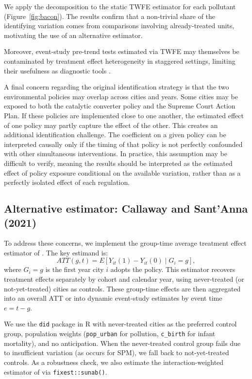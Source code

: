 \documentclass[10pt]{article}
\begin{document}
We apply the \citet{goodman2021} decomposition to the static TWFE estimator for each pollutant (Figure~\ref{fig:bacon}). The results confirm that a non-trivial share of the identifying variation comes from comparisons involving already-treated units, motivating the use of an alternative estimator.

Moreover, event-study pre-trend tests estimated via TWFE may themselves be contaminated by treatment effect heterogeneity in staggered settings, limiting their usefulness as diagnostic tools \citep{sunab2021}.

A final concern regarding the original identification strategy is that the two environmental policies may overlap across cities and years. Some cities may be exposed to both the catalytic converter policy and the Supreme Court Action Plan. If these policies are implemented close to one another, the estimated effect of one policy may partly capture the effect of the other. This creates an additional identification challenge. The coefficient on a given policy can be interpreted causally only if the timing of that policy is not perfectly confounded with other simultaneous interventions. In practice, this assumption may be difficult to verify, meaning the results should be interpreted as the estimated effect of policy exposure conditional on the available variation, rather than as a perfectly isolated effect of each regulation.

\subsection{Alternative estimator: Callaway and Sant'Anna (2021)}

To address these concerns, we implement the group-time average treatment effect estimator of \citet{callaway2021}. The key estimand is:
\begin{equation}\label{eq:att}
ATT(g,t) = E\left[Y_{it}(1) - Y_{it}(0) \mid G_i = g\right],
\end{equation}
where $G_i = g$ is the first year city $i$ adopts the policy. This estimator recovers treatment effects separately by cohort and calendar year, using never-treated (or not-yet-treated) cities as controls. These group-time effects are then aggregated into an overall ATT or into dynamic event-study estimates by event time $e = t - g$.

We use the \texttt{did} package in R with never-treated cities as the preferred control group, population weights (\texttt{pop\_urban} for pollution, \texttt{c\_birth} for infant mortality), and no anticipation. When the never-treated control group fails due to insufficient variation (as occurs for SPM), we fall back to not-yet-treated controls. As a robustness check, we also estimate the interaction-weighted estimator of \citet{sunab2021} via \texttt{fixest::sunab()}.
\end{document}
